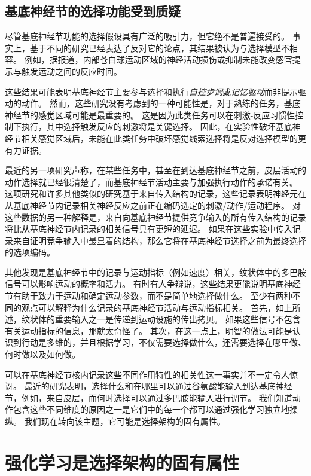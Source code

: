 \subsection{基底神经节的选择功能受到质疑}

尽管基底神经节功能的选择假设具有广泛的吸引力，但它绝不是普遍接受的。
事实上，基于不同的研究已经表达了反对它的论点，其结果被认为与选择模型不相容。
例如，据报道，内部苍白球运动区域的神经活动损伤或抑制未能改变感官提示与触发运动之间的反应时间。


这些结果可能表明基底神经节主要参与选择和执行\textit{自控步调}或\textit{记忆驱动}而非提示驱动的动作。
然而，这些研究没有考虑到的一种可能性是，对于熟练的任务，基底神经节的感觉区域可能是最重要的。
这是因为此类任务可以在刺激-反应习惯性控制下执行，其中选择触发反应的刺激将是关键选择。
因此，在实验性破坏基底神经节相关感觉区域后，未能在此类任务中破坏感觉线索选择将是反对选择模型的更有力证据。


最近的另一项研究声称，在某些任务中，甚至在到达基底神经节之前，皮层活动的动作选择就已经很清楚了，而基底神经节活动主要与加强执行动作的承诺有关。
这项研究和许多其他类似的研究基于来自传入结构的记录，这些记录表明神经元在从基底神经节内记录相关神经反应之前正在编码选定的刺激/动作/运动程序。
对这些数据的另一种解释是，来自向基底神经节提供竞争输入的所有传入结构的记录将比从基底神经节内记录的相关信号具有更短的延迟。
如果在这些实验中传入记录来自证明竞争输入中最显着的结构，那么它将在基底神经节选择之前为最终选择的选项编码。


其他发现是基底神经节中的记录与运动指标（例如速度）相关，纹状体中的多巴胺信号可以影响运动的概率和活力。
有时有人争辩说，这些结果更能说明基底神经节有助于致力于运动和确定运动参数，而不是简单地选择做什么。
至少有两种不同的观点可以解释为什么记录的基底神经节活动与运动指标相关。
首先，如上所述，纹状体的重要输入之一是传递到运动设施的传出拷贝。
如果这些信号不包含有关运动指标的信息，那就太奇怪了。
其次，在这一点上，明智的做法可能是认识到行动是多维的，并且根据学习，不仅需要选择做什么，还需要选择在哪里做、何时做以及如何做。


可以在基底神经节核内记录这些不同作用特性的相关性这一事实并不一定令人惊讶。
最近的研究表明，选择什么和在哪里可以通过谷氨酸能输入到达基底神经节，例如，来自皮层，而何时选择可以通过多巴胺能输入进行调节。
我们知道动作包含这些不同维度的原因之一是它们中的每一个都可以通过强化学习独立地操纵。
我们现在转向该主题，它可能是选择架构的固有属性。



\section{强化学习是选择架构的固有属性}

